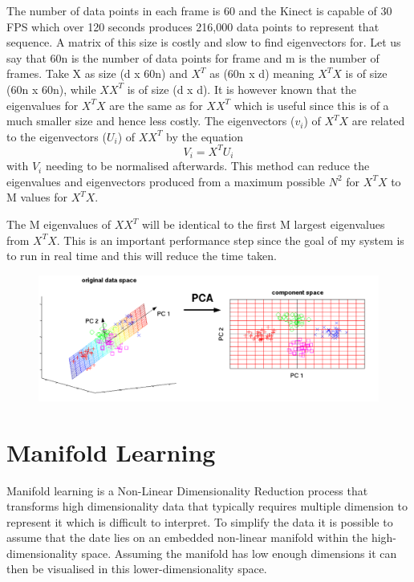 The number of data points in each frame is 60 and the Kinect is capable of 30 FPS which over 120 seconds produces 216,000 data points to represent that sequence. A matrix of this size is costly and slow to find eigenvectors for. Let us say that 60n is the number of data points for frame and m is the number of frames. Take X as size (d x 60n) and $X^T$ as (60n x d) meaning $X^TX$ is of size (60n x 60n), while $XX^T$ is of size (d x d). It is however known that the eigenvalues for $X^TX$ are the same as for $XX^T$ which is useful since this is of a much smaller size and hence less costly.\cite{fastPCA}
The eigenvectors ($v_i$) of $X^TX$ are related to the eigenvectors ($U_i$) of $XX^T$ by the equation $$V_i = X^TU_i$$ with $V_i$ needing to be normalised afterwards. This method can reduce the eigenvalues and eigenvectors produced from a maximum possible $N^2$ for $X^TX$ to M values for $X^TX$.

The M eigenvalues of $XX^T$ will be identical to the first M largest eigenvalues from $X^TX$. This is an important performance step since the goal of my system is to run in real time and this will reduce the time taken.

\begin{figure}[h]
    \centering
    \includegraphics[height=0.25\textheight]{fig02/PCA.pdf}
    \label{fig:kinect}
\end{figure}


\section{Manifold Learning}
Manifold learning is a Non-Linear Dimensionality Reduction process that transforms high dimensionality data that typically requires multiple dimension to represent it which is difficult to interpret. To simplify the data it is possible to assume that the date lies on an embedded non-linear manifold within the high-dimensionality space. Assuming the manifold has low enough dimensions it can then be visualised in this lower-dimensionality space.

